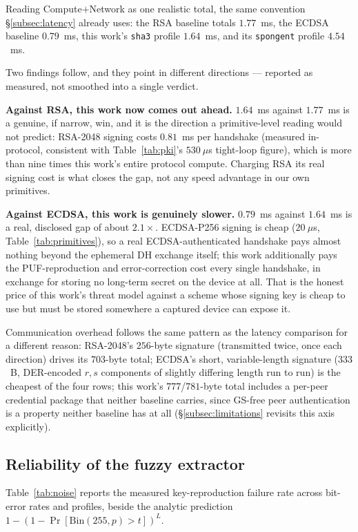 \documentclass[11pt,a4paper]{article}
\begin{document}
Reading Compute$+$Network as one realistic total, the same convention
\S\ref{subsec:latency} already uses: the RSA baseline totals $1.77$~ms, the
ECDSA baseline $0.79$~ms, this work's \texttt{sha3} profile $1.64$~ms, and its
\texttt{spongent} profile $4.54$~ms.

Two findings follow, and they point in different directions --- reported as
measured, not smoothed into a single verdict.

\textbf{Against RSA, this work now comes out ahead.} $1.64$~ms against
$1.77$~ms is a genuine, if narrow, win, and it is the direction a
primitive-level reading would not predict: RSA-2048 signing costs $0.81$~ms per
handshake (measured in-protocol, consistent with Table~\ref{tab:pki}'s
$530~\mu$s tight-loop figure), which is more than nine times this work's entire
protocol compute. Charging RSA its real signing cost is what closes the gap,
not any speed advantage in our own primitives.

\textbf{Against ECDSA, this work is genuinely slower.} $0.79$~ms against
$1.64$~ms is a real, disclosed gap of about $2.1\times$. ECDSA-P256 signing is
cheap ($20~\mu$s, Table~\ref{tab:primitives}), so a real ECDSA-authenticated
handshake pays almost nothing beyond the ephemeral DH exchange itself; this work
additionally pays the PUF-reproduction and error-correction cost every single
handshake, in exchange for storing no long-term secret on the device at all.
That is the honest price of this work's threat model against a scheme whose
signing key is cheap to use but must be stored somewhere a captured device can
expose it.

Communication overhead follows the same pattern as the latency comparison for
a different reason: RSA-2048's $256$-byte signature (transmitted twice, once
each direction) drives its $703$-byte total; ECDSA's short, variable-length
signature ($333$~B, DER-encoded $r,s$ components of slightly differing length
run to run) is the cheapest of the four rows; this work's $777$/$781$-byte total
includes a per-peer credential package that neither baseline carries, since
GS-free peer authentication is a property neither baseline has at all
(\S\ref{subsec:limitations} revisits this axis explicitly).

\subsection{Reliability of the fuzzy extractor}
\label{subsec:reliability}

Table~\ref{tab:noise} reports the measured key-reproduction failure rate across
bit-error rates and profiles, beside the analytic prediction
$1-(1-\Pr[\mathrm{Bin}(255,p)>t])^{L}$.
\end{document}
